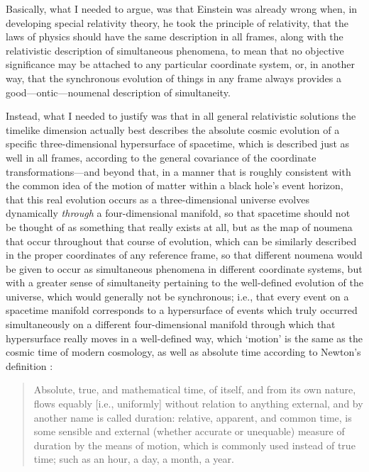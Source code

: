Basically, what I needed to argue, was that Einstein was already wrong when, in developing special relativity theory, he took the principle of relativity, that the laws of physics should have the same description in all frames, along with the relativistic description of simultaneous phenomena, to mean that no objective significance may be attached to any particular coordinate system, or, in another way, that the synchronous evolution of things in any frame always provides a good---ontic---noumenal description of simultaneity. 

Instead, what I needed to justify was that in all general relativistic solutions the timelike dimension actually best describes the absolute cosmic evolution of a specific three-dimensional hypersurface of spacetime, which is described just as well in all frames, according to the general covariance of the coordinate transformations---and beyond that, in a manner that is roughly consistent with the common idea of the motion of matter within a black hole's event horizon, that this real evolution occurs as a three-dimensional universe evolves dynamically \textit{through} a four-dimensional manifold, so that spacetime should not be thought of as something that really exists at all, but as the map of noumena that occur throughout that course of evolution, which can be similarly described in the proper coordinates of any reference frame, so that different noumena would be given to occur as simultaneous phenomena in different coordinate systems, but with a greater sense of simultaneity pertaining to the well-defined evolution of the universe, which would generally not be synchronous; i.e., that every event on a spacetime manifold corresponds to a hypersurface of events which truly occurred simultaneously on a different four-dimensional manifold through which that hypersurface really moves in a well-defined way, which `motion' is the same as the cosmic time of modern cosmology, as well as absolute time according to Newton's definition \cite{Newton1966}:
\begin{quotation}
Absolute, true, and mathematical time, of itself, and from its own nature, flows equably [i.e., uniformly] without relation to anything external, and by another name is called duration: relative, apparent, and common time, is some sensible and external (whether accurate or unequable) measure of duration by the means of motion, which is commonly used instead of true time; such as an hour, a day, a month, a year.
\end{quotation}


